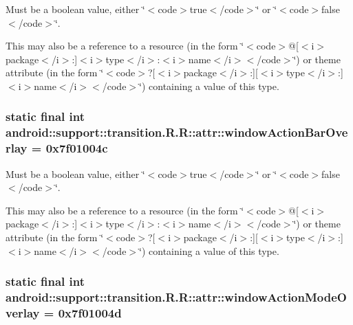 Must be a boolean value, either \char`\"{}$<$code$>$true$<$/code$>$\char`\"{} or \char`\"{}$<$code$>$false$<$/code$>$\char`\"{}. 

This may also be a reference to a resource (in the form \char`\"{}$<$code$>$@\mbox{[}$<$i$>$package$<$/i$>$:\mbox{]}$<$i$>$type$<$/i$>$:$<$i$>$name$<$/i$>$$<$/code$>$\char`\"{}) or theme attribute (in the form \char`\"{}$<$code$>$?\mbox{[}$<$i$>$package$<$/i$>$:\mbox{]}\mbox{[}$<$i$>$type$<$/i$>$:\mbox{]}$<$i$>$name$<$/i$>$$<$/code$>$\char`\"{}) containing a value of this type. \hypertarget{classandroid_1_1support_1_1transition_1_1_r_1_1attr_a264a466b6621f922354b49139b96e6a}{
\subsubsection[{windowActionBarOverlay}]{\setlength{\rightskip}{0pt plus 5cm}static final int android::support::transition.R.R::attr::windowActionBarOverlay = 0x7f01004c}}
\label{classandroid_1_1support_1_1transition_1_1_r_1_1attr_a264a466b6621f922354b49139b96e6a}


Must be a boolean value, either \char`\"{}$<$code$>$true$<$/code$>$\char`\"{} or \char`\"{}$<$code$>$false$<$/code$>$\char`\"{}. 

This may also be a reference to a resource (in the form \char`\"{}$<$code$>$@\mbox{[}$<$i$>$package$<$/i$>$:\mbox{]}$<$i$>$type$<$/i$>$:$<$i$>$name$<$/i$>$$<$/code$>$\char`\"{}) or theme attribute (in the form \char`\"{}$<$code$>$?\mbox{[}$<$i$>$package$<$/i$>$:\mbox{]}\mbox{[}$<$i$>$type$<$/i$>$:\mbox{]}$<$i$>$name$<$/i$>$$<$/code$>$\char`\"{}) containing a value of this type. \hypertarget{classandroid_1_1support_1_1transition_1_1_r_1_1attr_a9f4a4bd866805c4d1346faa2ed877f9}{
\subsubsection[{windowActionModeOverlay}]{\setlength{\rightskip}{0pt plus 5cm}static final int android::support::transition.R.R::attr::windowActionModeOverlay = 0x7f01004d}}
\label{classandroid_1_1support_1_1transition_1_1_r_1_1attr_a9f4a4bd866805c4d1346faa2ed877f9}


